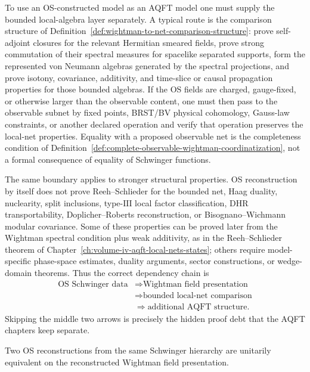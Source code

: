 To use an OS-constructed model as an AQFT model one must supply the bounded
local-algebra layer separately.  A typical route is the comparison structure
of Definition~\ref{def:wightman-to-net-comparison-structure}: prove
self-adjoint closures for the relevant Hermitian smeared fields, prove strong
commutation of their spectral measures for spacelike separated supports, form
the represented von Neumann algebras generated by the spectral projections,
and prove isotony, covariance, additivity, and time-slice or causal
propagation properties for those bounded algebras.  If the OS fields are
charged, gauge-fixed, or otherwise larger than the observable content, one
must then pass to the observable subnet by fixed points, BRST/BV physical
cohomology, Gauss-law constraints, or another declared operation and verify
that operation preserves the local-net properties.  Equality with a proposed
observable net is the completeness condition of
Definition~\ref{def:complete-observable-wightman-coordinatization}, not a
formal consequence of equality of Schwinger functions.

The same boundary applies to stronger structural properties.  OS
reconstruction by itself does not prove Reeh--Schlieder for the bounded net,
Haag duality, nuclearity, split inclusions, type-\(\mathrm{III}\) local
factor classification, DHR transportability, Doplicher--Roberts
reconstruction, or Bisognano--Wichmann modular covariance.  Some of these
properties can be proved later from the Wightman spectral condition plus
weak additivity, as in the Reeh--Schlieder theorem of
Chapter~\ref{ch:volume-iv-aqft-local-nets-states}; others require
model-specific phase-space estimates, duality arguments, sector
constructions, or wedge-domain theorems.  Thus the correct dependency chain is
\[
  \begin{aligned}
  \text{OS Schwinger data}
  &\Longrightarrow
  \text{Wightman field presentation} \\
  &\Longrightarrow
  \text{bounded local-net comparison} \\
  &\Longrightarrow
  \text{additional AQFT structure}.
  \end{aligned}
\]
Skipping the middle two arrows is precisely the hidden proof debt that the
AQFT chapters keep separate.

\begin{proposition}
\label{prop:os-reconstruction-uniqueness}
Two OS reconstructions from the same Schwinger hierarchy are unitarily
equivalent on the reconstructed Wightman field presentation.
\end{proposition}

